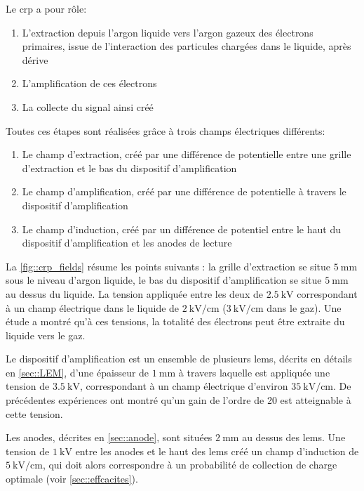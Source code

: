             Le \gls{crp} a pour rôle:
            \begin{enumerate}
                \item L'extraction depuis l'argon liquide vers l'argon gazeux des électrons primaires, issue de l'interaction des particules chargées dans le liquide, après dérive
                \item L'amplification de ces électrons
                \item La collecte du signal ainsi créé
            \end{enumerate}
            Toutes ces étapes sont réalisées grâce à trois champs électriques différents:
            \begin{enumerate}
                \item Le champ d'extraction, créé par une différence de potentielle entre une grille d'extraction et le bas du dispositif d'amplification
                \item Le champ d'amplification, créé par une différence de potentielle à travers le dispositif d'amplification
                \item Le champ d'induction, créé par un différence de potentiel entre le haut du dispositif d'amplification et les anodes de lecture
            \end{enumerate}
            La \autoref{fig::crp_fields} résume les points suivants : la grille d'extraction se situe $\SI{5}{\milli\meter}$ sous le niveau d'argon liquide, le bas du dispositif d'amplification se situe $\SI{5}{\milli\meter}$ au dessus du liquide. La tension appliquée entre les deux de $\SI{2.5}{\kilo\volt}$ correspondant à un champ électrique dans le liquide de $\SI{2}{\kilo\volt\per\centi\meter}$ ($\SI{3}{\kilo\volt\per\centi\meter}$ dans le gaz). Une étude \cite{guschin} a montré qu'à ces tensions, la totalité des électrons peut être extraite du liquide vers le gaz.
            
            Le dispositif d'amplification est un ensemble de plusieurs \glspl{lem}, décrits en détails en \autoref{sec::LEM}, d'une épaisseur de $\SI{1}{\milli\meter}$ à travers laquelle est appliquée une tension de $\SI{3.5}{\kilo\volt}$, correspondant à un champ électrique d'environ $\SI{35}{\kilo\volt\per\centi\meter}$. De précédentes expériences \cite{Badertscher,3L} ont montré qu'un gain de l'ordre de 20 est atteignable à cette tension.
            
            Les anodes, décrites en \autoref{sec::anode}, sont situées $\SI{2}{\milli\meter}$ au dessus des \glspl{lem}. Une tension de $\SI{1}{\kilo\volt}$ entre les anodes et le haut des \glspl{lem} créé un champ d'induction de $\SI{5}{\kilo\volt\per\centi\meter}$, qui doit alors correspondre à un probabilité de collection de charge optimale (voir \autoref{sec::effcacites}).
            
